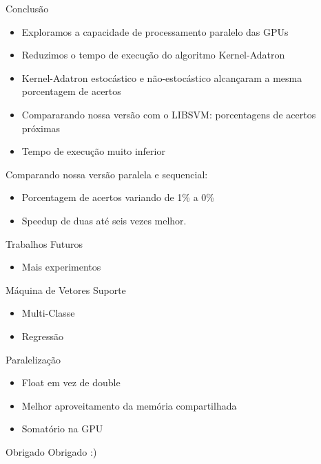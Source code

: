 \documentclass{beamer}
\begin{document}
\begin{frame}{Conclusão}
    \begin{itemize}
        \item Exploramos a capacidade de processamento paralelo das GPUs
        \item Reduzimos o tempo de execução do algoritmo Kernel-Adatron
        \item Kernel-Adatron estocástico e não-estocástico alcançaram a mesma porcentagem de acertos
        \item Compararando nossa versão com o LIBSVM: porcentagens de acertos próximas
        \item Tempo de execução muito inferior
    \end{itemize}
    Comparando nossa versão paralela e sequencial:
    \begin{itemize}
        \item Porcentagem de acertos variando de 1\% a 0\%
        \item Speedup de duas até seis vezes melhor.
    \end{itemize}
\end{frame}

\begin{frame}{Trabalhos Futuros}
    \begin{itemize}
        \item Mais experimentos
    \end{itemize}
    Máquina de Vetores Suporte
    \begin{itemize}
        \item Multi-Classe
        \item Regressão
    \end{itemize}
    Paralelização
    \begin{itemize}
        \item Float em vez de double
        \item Melhor aproveitamento da memória compartilhada
        \item Somatório na GPU
    \end{itemize}
\end{frame}

\begin{frame}{Obrigado}
\centering
    Obrigado :)
\end{frame}
\end{document}
